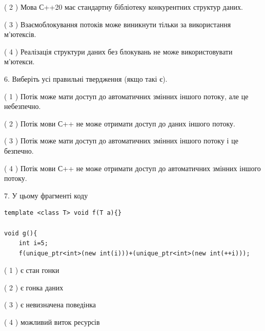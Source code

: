 \documentclass[12pt, ukrainian]{article}
\begin{document}
\begin {large}
{( 2 ) Мова С++20 має стандартну бібліотеку конкурентних структур даних.%

( 3 ) Взаємоблокування потоків може виникнути тільки за використання м’ютексів.%

( 4 ) Реалізація структури даних без блокувань не може використовувати м’ютекси.%
\newpage



\vspace{5mm}
6. Виберіть усі правильні твердження (якщо такі є).\par
\vspace{2mm}

( 1 ) Потік може мати доступ до автоматичних змінних іншого потоку, але це небезпечно.%

( 2 ) Потік мови С++ не може отримати доступ до даних іншого потоку.%

( 3 ) Потік може мати доступ до автоматичних змінних іншого потоку і це безпечно.%

( 4 ) Потік мови С++ не може отримати доступ до автоматичних змінних іншого потоку.%


\vspace{5mm}
7. У цьому фрагменті коду
\begin{verbatim}
template <class T> void f(T a){}

void g(){
    int i=5;
    f(unique_ptr<int>(new int(i)))+(unique_ptr<int>(new int(++i)));
\end{verbatim}
( 1 ) є стан гонки%

( 2 ) є гонка даних%

( 3 ) є невизначена поведінка%

( 4 ) можливий виток ресурсів%
}
\end {large}
\end{document}
